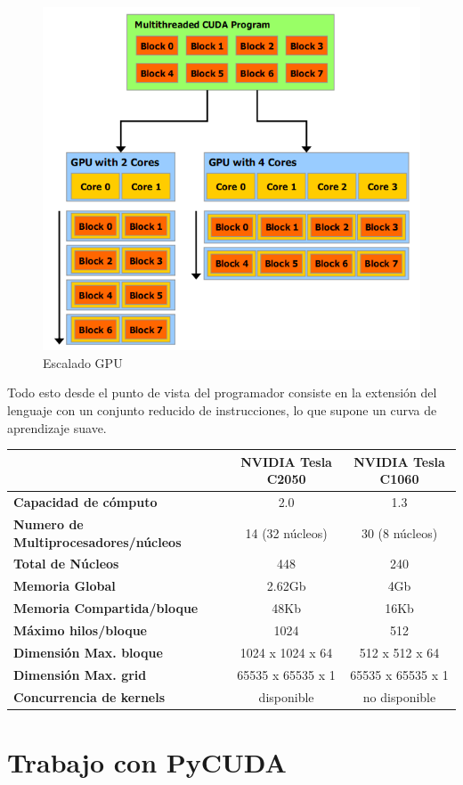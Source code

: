\documentclass[twoside]{article}
\begin{document}
\begin{figure}
	\includegraphics[width=.5\textwidth]{EscaladoGPU.png}
	\caption{\label{fig:EscaladoGPU} Escalado GPU}
\end{figure}

Todo esto desde el punto de vista del programador consiste en la extensión del lenguaje con un conjunto reducido de instrucciones, lo que supone un curva de aprendizaje suave.

\begin{center}
   \begin{tabular}{ | l | c | c | }
      \hline
      & \textbf{NVIDIA Tesla C2050} & \textbf{NVIDIA Tesla C1060} \\ \hline
      \textbf{Capacidad de cómputo} & 2.0 & 1.3 \\ \hline
      \textbf{Numero de Multiprocesadores/núcleos} & 14 (32 núcleos) & 30 (8 núcleos) \\ \hline
      \textbf{Total de Núcleos} & 448 & 240 \\ \hline
      \textbf{Memoria Global} & 2.62Gb & 4Gb \\ \hline
      \textbf{Memoria Compartida/bloque} & 48Kb & 16Kb \\ \hline
      \textbf{Máximo hilos/bloque} & 1024 & 512 \\ \hline
      \textbf{Dimensión Max. bloque} & 1024 x 1024 x 64 & 512 x 512 x 64 \\ \hline
      \textbf{Dimensión Max. grid} & 65535 x 65535 x 1 & 65535 x 65535 x 1 \\ \hline
      \textbf{Concurrencia de kernels} & disponible & no disponible \\
   \hline
   \end{tabular}
\end{center}

\section{Trabajo con PyCUDA}
\end{document}
